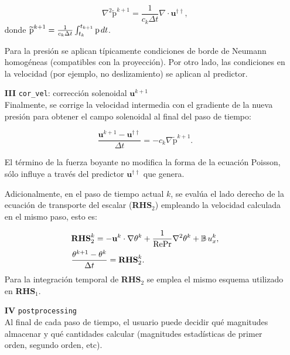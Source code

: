 \begin{enumerate}
\begin{equation}
\nabla^2 \widetilde{\text{p}}^{k+1} = \frac{1}{c_k \Delta t} \nabla \cdot \mathbf{u}^{\dagger \dagger},
\end{equation}
donde $\widetilde{\text{p}}^{k+1}= \frac{1}{c_k \Delta t} \int^{t_{k+1}}_{t_k} \text{p} \hspace{0.5mm} dt$. 

Para la presión se aplican típicamente condiciones de borde de Neumann homogéneas (compatibles con la proyección). Por otro lado, las condiciones en la velocidad (por ejemplo, no deslizamiento) se aplican al predictor.

	\item[\textbf{III}]  \texttt{cor\_vel}: corrección solenoidal $\mathbf{u}^{k+1}$ \\
	Finalmente, se corrige la velocidad intermedia con el gradiente de la nueva presión para obtener
el campo solenoidal al final del paso de tiempo:

\begin{equation}
\frac{ \mathbf{u}^{k+1} - \mathbf{u}^{\dagger \dagger} }{\Delta t} = - c_k \nabla \widetilde{\text{p}}^{k+1} \text{.}
\label{eq:correccion}
\end{equation}

El término de la fuerza boyante no modifica la forma de la ecuación Poisson, sólo influye a través del predictor $\mathbf{u}^{\dagger \dagger}$ que genera.

Adicionalmente, en el paso de tiempo actual $k$, se evalúa el lado derecho de la ecuación de transporte del escalar (\textbf{RHS}$_2$) empleando la velocidad calculada en el mismo paso, esto es:

\begin{equation}
\begin{aligned}
& \textbf{RHS}_2^k = - \mathbf{u}^{k} \cdot \nabla \theta^k + \frac{1}{\text{Re} \text{Pr}} \nabla^2 \theta^k + \mathbb{B} \hspace{0.5mm} u_x^{k}, \\
& \frac{\theta^{k+1} - \theta^{k}}{\Delta t} = \textbf{RHS}_2^k \text{.}
\end{aligned}
\end{equation}
Para la integración temporal de \textbf{RHS}$_2$ se emplea el mismo esquema utilizado en \textbf{RHS}$_1$.

\item[\textbf{IV}] \texttt{postprocessing} \\
Al final de cada paso de tiempo, el usuario puede decidir qué magnitudes almacenar y qué cantidades calcular (magnitudes estadísticas de primer orden, segundo orden, etc).

\end{enumerate}

